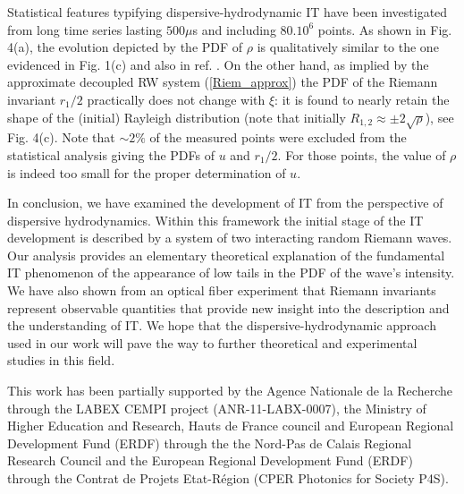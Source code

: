 \documentclass[twocolumn,preprintnumbers,amsmath,amssymb,superscriptaddress]{revtex4}
\begin{document}
Statistical features typifying dispersive-hydrodynamic IT 
have been investigated from 
long time series lasting $500 \mu$s and including
$80.10^{6}$ points. As shown in Fig. 4(a), the evolution depicted by the PDF
of $\rho$ is qualitatively similar to the one evidenced in Fig. 1(c)
and also in ref. \cite{Randoux:14}. On the other hand, as implied 
by the approximate 
decoupled RW system (\ref{Riem_approx}) the PDF of the Riemann
invariant $r_{1}/2$ practically does not change with $\xi$: it is
found to nearly retain the shape of the (initial) Rayleigh
distribution (note that initially $R_{1,2} \approx \pm 2 \sqrt{\rho}$), see Fig. 4(c). Note that 
$\sim 2\%$ of the measured points were excluded from the statistical 
analysis giving the PDFs of $u$ and $r_{1}/2$. For those points, the value
of $\rho$ is indeed too small for the proper determination of $u$. 

In conclusion, we have examined  the development  of IT from the
perspective of dispersive hydrodynamics. Within this framework the
initial stage of the IT development is described by a system of two
interacting random Riemann waves. Our analysis provides  an elementary
theoretical explanation of the fundamental IT phenomenon of the
appearance of low tails in the PDF of the wave's intensity. We  have
also shown from an optical fiber experiment that  
Riemann invariants represent  observable quantities
that provide new insight into the  description and the understanding
of IT. We hope that the dispersive-hydrodynamic approach used in
our work will pave the way to further theoretical  and experimental
studies in this field.

This work has been partially supported 
by the Agence Nationale de la
Recherche  through the LABEX CEMPI project (ANR-11-LABX-0007),  
the Ministry of Higher Education and Research,
Hauts de France council and European Regional Development 
Fund (ERDF) through the
the Nord-Pas de Calais Regional Research Council and the European
Regional Development Fund (ERDF) through the Contrat de Projets
Etat-R\'egion (CPER Photonics for Society P4S).





\end{document}
